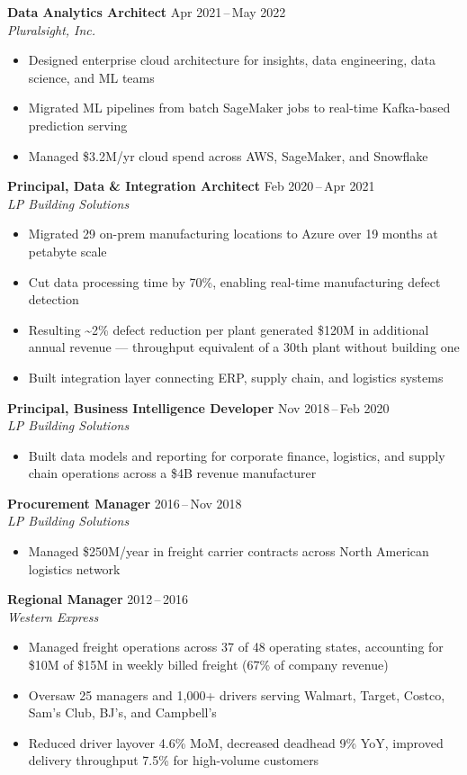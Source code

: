 \documentclass[letterpaper,18pt]{extarticle}
\begin{document}
\textbf{Data Analytics Architect} \hfill Apr 2021\,--\,May 2022 \\
\textit{Pluralsight, Inc.}
\begin{itemize}
  \item Designed enterprise cloud architecture for insights, data engineering, data science, and ML teams
  \item Migrated ML pipelines from batch SageMaker jobs to real-time Kafka-based prediction serving
  \item Managed \$3.2M/yr cloud spend across AWS, SageMaker, and Snowflake
\end{itemize}

\textbf{Principal, Data \& Integration Architect} \hfill Feb 2020\,--\,Apr 2021 \\
\textit{LP Building Solutions}
\begin{itemize}
  \item Migrated 29 on-prem manufacturing locations to Azure over 19 months at petabyte scale
  \item Cut data processing time by 70\%, enabling real-time manufacturing defect detection
  \item Resulting \textasciitilde2\% defect reduction per plant generated \$120M in additional annual revenue --- throughput equivalent of a 30th plant without building one
  \item Built integration layer connecting ERP, supply chain, and logistics systems
\end{itemize}

\textbf{Principal, Business Intelligence Developer} \hfill Nov 2018\,--\,Feb 2020 \\
\textit{LP Building Solutions}
\begin{itemize}
  \item Built data models and reporting for corporate finance, logistics, and supply chain operations across a \$4B revenue manufacturer
\end{itemize}

\textbf{Procurement Manager} \hfill 2016\,--\,Nov 2018 \\
\textit{LP Building Solutions}
\begin{itemize}
  \item Managed \$250M/year in freight carrier contracts across North American logistics network
\end{itemize}

\textbf{Regional Manager} \hfill 2012\,--\,2016 \\
\textit{Western Express}
\begin{itemize}
  \item Managed freight operations across 37 of 48 operating states, accounting for \$10M of \$15M in weekly billed freight (67\% of company revenue)
  \item Oversaw 25 managers and 1,000+ drivers serving Walmart, Target, Costco, Sam's Club, BJ's, and Campbell's
  \item Reduced driver layover 4.6\% MoM, decreased deadhead 9\% YoY, improved delivery throughput 7.5\% for high-volume customers
\end{itemize}
\end{document}
